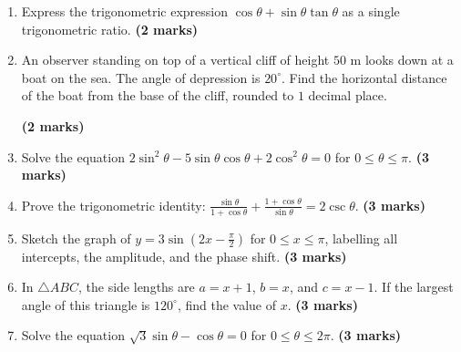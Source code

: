 \documentclass[11pt,a4paper]{article}
\begin{document}
\begin{enumerate}
    \item Express the trigonometric expression $\cos\theta + \sin\theta\tan\theta$ as a single trigonometric ratio. \hfill \textbf{(2 marks)}
    \vspace{0.5cm}

    \item An observer standing on top of a vertical cliff of height $50\text{ m}$ looks down at a boat on the sea. The angle of depression is $20^\circ$. Find the horizontal distance of the boat from the base of the cliff, rounded to $1$ decimal place.
    
     \hfill \textbf{(2 marks)}
    \vspace{0.5cm}

    \item Solve the equation $2\sin^2 \theta - 5\sin \theta \cos \theta + 2\cos^2 \theta = 0$ for $0 \le \theta \le \pi$. \hfill \textbf{(3 marks)}
    \vspace{0.5cm}

    \item Prove the trigonometric identity: $\frac{\sin \theta}{1 + \cos \theta} + \frac{1 + \cos \theta}{\sin \theta} = 2\csc \theta$. \hfill \textbf{(3 marks)}
    \vspace{0.5cm}

    \item Sketch the graph of $y = 3\sin\left(2x - \frac{\pi}{2}\right)$ for $0 \le x \le \pi$, labelling all intercepts, the amplitude, and the phase shift. \hfill \textbf{(3 marks)}
    \vspace{0.5cm}

    \item In $\triangle ABC$, the side lengths are $a = x+1$, $b = x$, and $c = x-1$. If the largest angle of this triangle is $120^\circ$, find the value of $x$. \hfill \textbf{(3 marks)}
    \vspace{0.5cm}

    \item Solve the equation $\sqrt{3}\sin\theta - \cos\theta = 0$ for $0 \le \theta \le 2\pi$. \hfill \textbf{(3 marks)}
    \vspace{0.5cm}


\end{enumerate}
\end{document}
